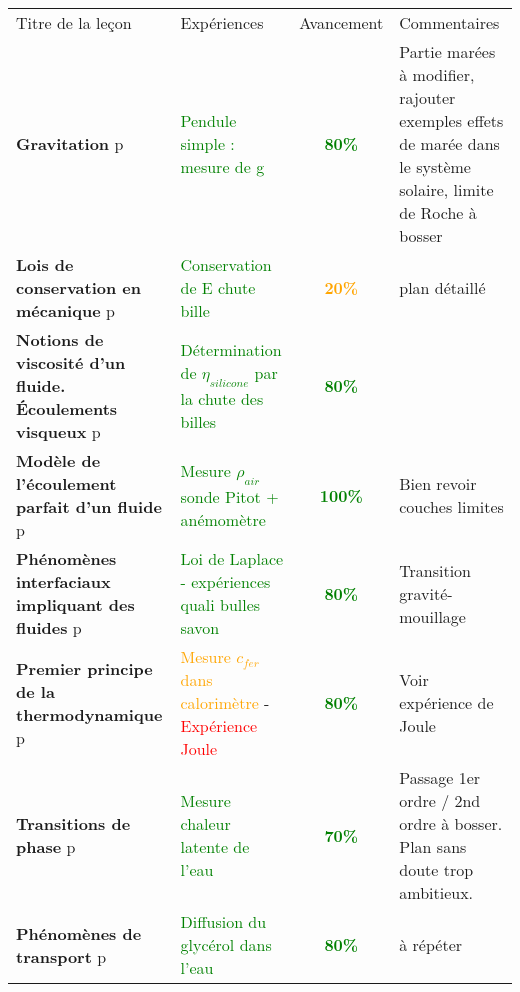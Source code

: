 \begin{changemargin}{-1.5cm}{-0cm}

\begin{center}
\begin{tabularx}{\paperwidth-2cm}{| X | X | c | X |}
  \hline
  \rowcolor{gray!20}\multicolumn{4}{c}{Avancement préparation oraux Leçons Physique} \\
  \hline 
  Titre de la leçon & Expériences & Avancement & Commentaires \\
  \hline
\textbf{Gravitation} p\pageref{LP_Gravitation}  & \textcolor{green}{Pendule simple : mesure de g} & \textcolor{green}{\textbf{80\%}}  & Partie marées à modifier, rajouter exemples effets de marée dans le système solaire, limite de Roche à bosser  \\
  \hline 
  \hline
     \textbf{Lois de conservation en mécanique} p\pageref{LP_LoisConservation} & \textcolor{green}{Conservation de E chute bille} & \textcolor{orange}{\textbf{20\%}} & plan détaillé \\
  \hline 
    \textbf{Notions de viscosité d'un fluide. \'{E}coulements visqueux} p\pageref{LP_Viscosite} & \textcolor{green}{Détermination de $\eta_{silicone}$ par la chute des billes}  & \textcolor{green}{\textbf{80\%}} &  \\
  \hline 
  \textbf{Modèle de l'écoulement parfait d'un fluide} p\pageref{LP_EcoulementParfait} & \textcolor{green}{Mesure $\rho_{air}$ sonde Pitot + anémomètre} & \textcolor{green}{\textbf{100\%}} & Bien revoir couches limites \\
  \hline
  \textbf{Phénomènes interfaciaux impliquant des fluides} p\pageref{LP_PhenomenesInterfaciaux} & \textcolor{green}{Loi de Laplace - expériences quali bulles savon }& \textcolor{green}{\textbf{80\%}} & Transition gravité-mouillage \\
  \hline 
  \hline
  \textbf{Premier principe de la thermodynamique} p\pageref{LP_PremierPrincipe} & \textcolor{orange}{Mesure $c_{fer}$ dans calorimètre} - \textcolor{red}{Expérience Joule} & \textcolor{green}{\textbf{80\%}} & Voir expérience de Joule\\
  \hline 
  \textbf{Transitions de phase} p\pageref{LP_TransitionPhase} & \textcolor{green}{Mesure chaleur latente de l'eau} & \textcolor{green}{\textbf{70\%}} & Passage 1er ordre / 2nd ordre à bosser. Plan sans doute trop ambitieux.\\
  \hline 
  \textbf{Phénomènes de transport} p\pageref{LP_Transport} & \textcolor{green}{Diffusion du glycérol dans l'eau} & \textcolor{green}{\textbf{80\%}} & à répéter\\

\end{tabularx}
\end{center}
\end{changemargin}
